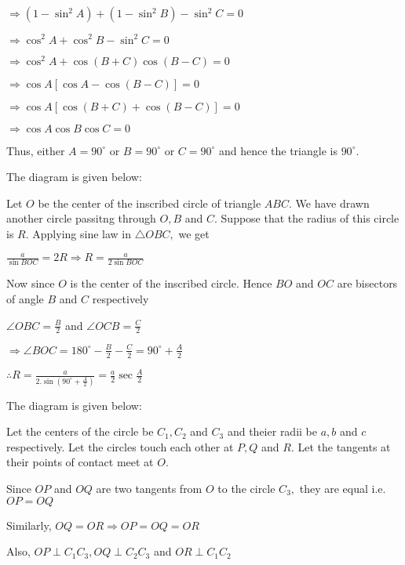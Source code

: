   $\Rightarrow (1 - \sin^2A) + (1 - \sin^2B) - \sin^2C = 0$

  $\Rightarrow \cos^2A + \cos^2B - \sin^2C = 0$

  $\Rightarrow \cos^2A + \cos(B + C)\cos(B - C) = 0$

  $\Rightarrow \cos A[\cos A - \cos(B - C)] = 0$

  $\Rightarrow \cos A[\cos(B + C) + \cos(B - C)] = 0$

  $\Rightarrow \cos A\cos B\cos C = 0$

  Thus, either $A = 90^\circ$ or $B = 90^\circ$ or $C = 90^\circ$ and hence the triangle is $90^\circ.$

\item The diagram is given below:

  \startplacefigure
    \externalfigure[20_7.pdf]
  \stopplacefigure

  Let $O$ be the center of the inscribed circle of triangle $ABC.$ We have drawn another circle passitng through
  $O, B$ and $C.$ Suppose that the radius of this circle is $R.$ Applying sine law in $\triangle OBC,$
  we get

  $\frac{a}{\sin BOC} = 2R \Rightarrow R = \frac{a}{2\sin BOC}$

  Now since $O$ is the center of the inscribed circle. Hence $BO$ and $OC$ are bisectors of angle $B$
  and $C$ respectively

  $\angle OBC = \frac{B}{2}$ and $\angle OCB = \frac{C}{2}$

  $\Rightarrow \angle BOC = 180^\circ - \frac{B}{2} - \frac{C}{2} = 90^\circ + \frac{A}{2}$

  $\therefore R = \frac{a}{2.\sin\left(90^\circ + \frac{A}{2}\right)} = \frac{a}{2}\sec\frac{A}{2}$

\item The diagram is given below:

  \startplacefigure
    \externalfigure[20_8.pdf]
  \stopplacefigure

  Let the centers of the circle be $C_1, C_2$ and $C_3$ and theier radii be $a, b$ and $c$
  respectively. Let the circles touch each other at $P, Q$ and $R.$ Let the tangents at their points of contact
  meet at $O.$

  Since $OP$ and $OQ$ are two tangents from $O$ to the circle $C_3,$ they are equal i.e. $OP =
  OQ$

  Similarly, $OQ = OR \Rightarrow OP=OQ=OR$

  Also, $OP\perp C_1C_3, OQ\perp C_2C_3$ and $OR\perp C_1C_2$

